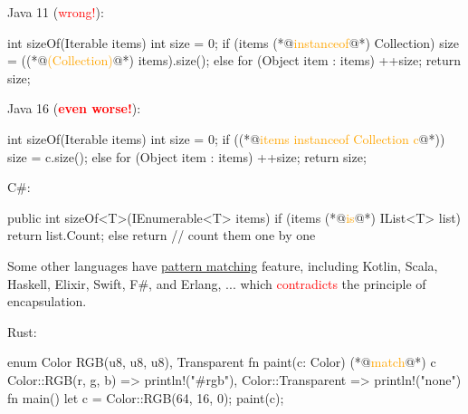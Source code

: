 \documentclass{article}
\begin{document}
\begin{pptWide}{2}
Java 11 (\textcolor{red}{wrong!}):
\par
{\small\begin{ffcode}
int sizeOf(Iterable items) {
  int size = 0;
  if (items (*@\textcolor{orange}{instanceof}@*) Collection) {
    size = ((*@\textcolor{orange}{(Collection)}@*) items).size();
  } else {
    for (Object item : items) {
      ++size;
    }
  }
  return size;
}
\end{ffcode}
}
\par\columnbreak\par
Java 16 (\textcolor{red}{\textbf{even worse!}}):
\par
{\small\begin{ffcode}
int sizeOf(Iterable items) {
  int size = 0;
  if ((*@\textcolor{orange}{items instanceof Collection c}@*)) {
    size = c.size();
  } else {
    for (Object item : items) {
      ++size;
    }
  }
  return size;
}
\end{ffcode}
}
\end{pptWide}
\par
\plush{}

\begin{pptWide}{2}
C\#:\par
{\scriptsize\begin{ffcode}
public int sizeOf<T>(IEnumerable<T> items) {
  if (items (*@\textcolor{orange}{is}@*) IList<T> list) {
    return list.Count;
  } else {
    return // count them one by one
  }
}
\end{ffcode}
}
\par
Some other languages have \ul{pattern matching} feature,
including Kotlin, Scala, Haskell, Elixir, Swift, F\#, and Erlang, ...
which \textcolor{red}{contradicts} the principle of encapsulation.
\par\columnbreak\par
Rust:
\par
{\scriptsize\begin{ffcode}
enum Color {
  RGB(u8, u8, u8),
  Transparent
}
fn paint(c: Color) {
  (*@\textcolor{orange}{match}@*) c {
    Color::RGB(r, g, b) =>
      println!("#{r}{g}{b}"),
    Color::Transparent =>
      println!("none")
  }
}
fn main() {
  let c = Color::RGB(64, 16, 0);
  paint(c);
}
\end{ffcode}
}
\end{pptWide}
\par
\plush{}
\end{document}
